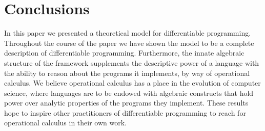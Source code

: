 \section{Conclusions}

In this paper we presented a theoretical model for differentiable programming.
Throughout the course of the paper we have shown the model to be a complete description of differentiable programming.
Furthermore, the innate algebraic structure of the framework supplements the descriptive power of a language with the ability to reason about the programs it implements, by way of operational calculus.
We believe operational calculus has a place in the evolution of computer science, where languages are to be endowed with algebraic constructs that hold power over analytic properties of the programs they implement.
These results hope to inspire other practitioners of differentiable programming to reach for operational calculus in their own work. 
